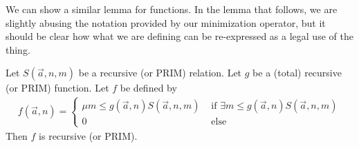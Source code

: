 We can show a similar lemma for functions. In the lemma that follows, we are slightly abusing the notation provided by our minimization operator, but it should be clear how what we are defining can be re-expressed as a legal use of the thing.
\begin{lemma}
    Let $S(\vec{a},n,m)$ be a recursive (or PRIM) relation. Let $g$ be a (total) recursive (or PRIM) function. Let $f$ be defined by
    \begin{align}
        f(\vec{a},n) = \begin{cases}
                        \mu m \leq g(\vec{a},n) S(\vec{a},n,m) & \textrm{ if $\exists m \leq g(\vec{a},n)S(\vec{a},n,m)$} \\
                        0 & \textrm{ else}
        \end{cases}
    \end{align}
    Then $f$ is recursive (or PRIM).
\end{lemma}

